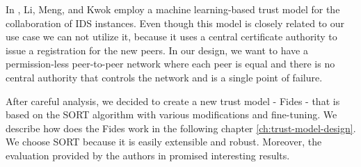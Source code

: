 In \cite{li2014design}, Li, Meng, and Kwok employ a machine learning-based trust model for the collaboration of IDS instances.
Even though this model is closely related to our use case we can not utilize it, because it uses a central certificate authority to issue a registration for the new peers. 
In our design, we want to have a permission-less peer-to-peer network where each peer is equal and there is no central authority that controls the network and is a single point of failure.

\vspace{1cm}

\noindent
After careful analysis, we decided to create a new trust model - Fides - that is based on the SORT algorithm with various modifications and fine-tuning.
We describe how does the Fides work in the following chapter \ref{ch:trust-model-design}.
We choose SORT because it is easily extensible and robust. 
Moreover, the evaluation provided by the authors in \cite{sort} promised interesting results.